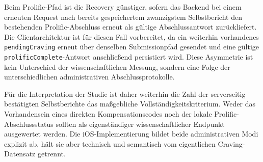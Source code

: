 \begin{neu}
Beim Prolific-Pfad ist die Recovery günstiger, sofern das Backend bei einem erneuten Request nach bereits gespeichertem zwanzigstem Selbstbericht den bestehenden Prolific-Abschluss erneut als gültige Abschlussantwort zurückliefert. Die Clientarchitektur ist für diesen Fall vorbereitet, da ein weiterhin vorhandenes \texttt{pendingCraving} erneut über denselben Submissionpfad gesendet und eine gültige \texttt{prolificComplete}-Antwort anschließend persistiert wird. Diese Asymmetrie ist kein Unterschied der wissenschaftlichen Messung, sondern eine Folge der unterschiedlichen administrativen Abschlussprotokolle.

Für die Interpretation der Studie ist daher weiterhin die Zahl der serverseitig bestätigten Selbstberichte das maßgebliche Vollständigkeitskriterium. Weder das Vorhandensein eines direkten Kompensationscodes noch der lokale Prolific-Abschlussstatus sollten als eigenständiger wissenschaftlicher Endpunkt ausgewertet werden. Die iOS-Implementierung bildet beide administrativen Modi explizit ab, hält sie aber technisch und semantisch vom eigentlichen Craving-Datensatz getrennt.
\end{neu}

